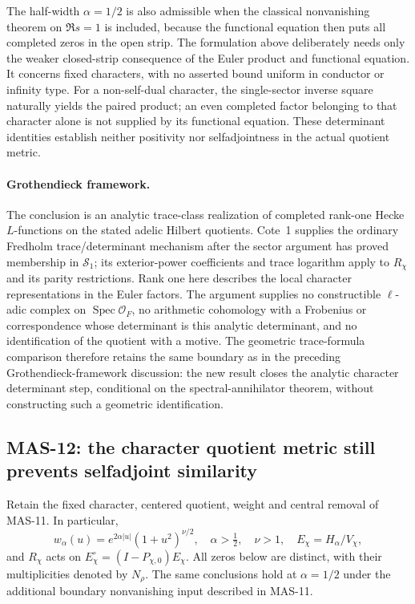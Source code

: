 \documentclass[11pt,a4paper]{article}
\newcommand{\Spec}{\operatorname{Spec}}
\newcommand{\fid}[1]{\textsf{#1}}
\begin{document}
The half-width $\alpha=1/2$ is also admissible when the classical nonvanishing theorem on $\Re s=1$ is included, because the functional equation then puts all completed zeros in the open strip. The formulation above deliberately needs only the weaker closed-strip consequence of the Euler product and functional equation. It concerns fixed characters, with no asserted bound uniform in conductor or infinity type. For a non-self-dual character, the single-sector inverse square naturally yields the paired product; an even completed factor belonging to that character alone is not supplied by its functional equation. These determinant identities establish neither positivity nor selfadjointness in the actual quotient metric.

\paragraph{Grothendieck framework.}
The conclusion is an analytic trace-class realization of completed rank-one Hecke $L$-functions on the stated adelic Hilbert quotients. Cote~1 supplies the ordinary Fredholm trace/determinant mechanism after the sector argument has proved membership in $\mathcal S_1$; its exterior-power coefficients and trace logarithm apply to $R_\chi$ and its parity restrictions. Rank one here describes the local character representations in the Euler factors. The argument supplies no constructible $\ell$-adic complex on $\Spec\mathcal O_F$, no arithmetic cohomology with a Frobenius or correspondence whose determinant is this analytic determinant, and no identification of the quotient with a motive. The geometric trace-formula comparison therefore retains the same boundary as in the preceding Grothendieck-framework discussion: the new result closes the analytic character determinant step, conditional on the spectral-annihilator theorem, without constructing such a geometric identification.


\subsection{MAS-12: the character quotient metric still prevents selfadjoint similarity}
Retain the fixed character, centered quotient, weight and central removal of \fid{MAS-11}. In particular,
\[
 w_\alpha(u)=e^{2\alpha|u|}(1+u^2)^{\nu/2},\quad
 \alpha>\tfrac12,\quad\nu>1,\quad
 E_\chi=H_\alpha/V_\chi,
\]
and $R_\chi$ acts on $E_\chi^\circ=(I-P_{\chi,0})E_\chi$. All zeros below are distinct, with their multiplicities denoted by $N_\rho$. The same conclusions hold at $\alpha=1/2$ under the additional boundary nonvanishing input described in \fid{MAS-11}.
\end{document}
